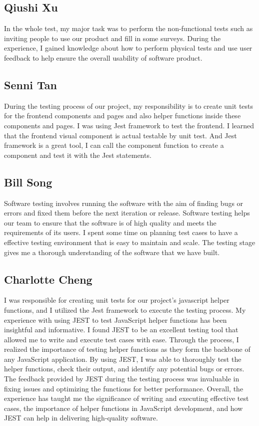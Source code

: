 \documentclass[12pt, oneside, openany, titlepage]{article}
\begin{document}
\subsection{Qiushi Xu}
In the whole test, my major task was to perform the non-functional tests such as inviting people to use our product and fill in some surveys. During the experience, I gained knowledge about how to perform physical tests and use user feedback to help ensure the overall usability of software product.

\subsection{Senni Tan}
During the testing process of our project, my responsibility is to create unit tests for the frontend components and pages and also helper functions inside these components and pages. I was using Jest framework to test the frontend. I learned that the frontend visual component is actual testable by unit test. And Jest framework is a great tool, I can call the component function to create a component and test it with the Jest statements. 

\subsection{Bill Song}
Software testing involves running the software with the aim of finding bugs or errors and fixed them before the next iteration or release. Software testing helps our team to ensure that the software is of high quality and meets the requirements of its users. I spent some time on planning test cases to have a effective testing environment that is easy to maintain and scale. The testing stage gives me a thorough understanding of the software that we have built.

\subsection{Charlotte Cheng}
I was responsible for creating unit tests for our project's javascript helper functions, and I utilized the Jest framework to execute the testing process. My experience with using JEST to test JavaScript helper functions has been insightful and informative. I found JEST to be an excellent testing tool that allowed me to write and execute test cases with ease. Through the process, I realized the importance of testing helper functions as they form the backbone of any JavaScript application. By using JEST, I was able to thoroughly test the helper functions, check their output, and identify any potential bugs or errors. The feedback provided by JEST during the testing process was invaluable in fixing issues and optimizing the functions for better performance. Overall, the experience has taught me the significance of writing and executing effective test cases, the importance of helper functions in JavaScript development, and how JEST can help in delivering high-quality software.
\end{document}
